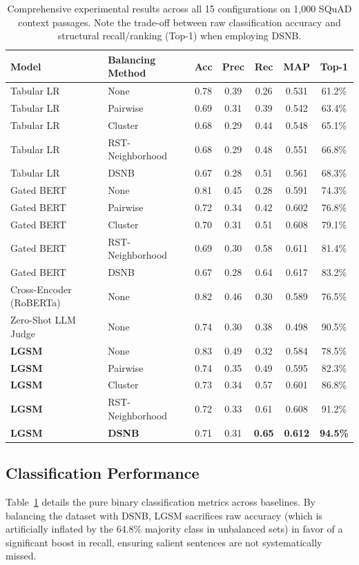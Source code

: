\documentclass[11pt,a4paper,twocolumn]{article}
\begin{document}
\begin{table}[t]
\centering
\footnotesize
\begin{tabular}{llccccc}
\toprule
\textbf{Model} & \textbf{Balancing Method} & \textbf{Acc} & \textbf{Prec} & \textbf{Rec} & \textbf{MAP} & \textbf{Top-1} \\
\midrule
Tabular LR & None & 0.78 & 0.39 & 0.26 & 0.531 & 61.2\% \\
Tabular LR & Pairwise & 0.69 & 0.31 & 0.39 & 0.542 & 63.4\% \\
Tabular LR & Cluster & 0.68 & 0.29 & 0.44 & 0.548 & 65.1\% \\
Tabular LR & RST-Neighborhood & 0.68 & 0.29 & 0.48 & 0.551 & 66.8\% \\
Tabular LR & DSNB & 0.67 & 0.28 & 0.51 & 0.561 & 68.3\% \\
\midrule
Gated BERT & None & 0.81 & 0.45 & 0.28 & 0.591 & 74.3\% \\
Gated BERT & Pairwise & 0.72 & 0.34 & 0.42 & 0.602 & 76.8\% \\
Gated BERT & Cluster & 0.70 & 0.31 & 0.51 & 0.608 & 79.1\% \\
Gated BERT & RST-Neighborhood & 0.69 & 0.30 & 0.58 & 0.611 & 81.4\% \\
Gated BERT & DSNB & 0.67 & 0.28 & 0.64 & 0.617 & 83.2\% \\
\midrule
Cross-Encoder (RoBERTa) & None & 0.82 & 0.46 & 0.30 & 0.589 & 76.5\% \\
Zero-Shot LLM Judge & None & 0.74 & 0.30 & 0.38 & 0.498 & 90.5\% \\
\midrule
\textbf{LGSM} & None & 0.83 & 0.49 & 0.32 & 0.584 & 78.5\% \\
\textbf{LGSM} & Pairwise & 0.74 & 0.35 & 0.49 & 0.595 & 82.3\% \\
\textbf{LGSM} & Cluster & 0.73 & 0.34 & 0.57 & 0.601 & 86.8\% \\
\textbf{LGSM} & RST-Neighborhood & 0.72 & 0.33 & 0.61 & 0.608 & 91.2\% \\
\textbf{LGSM} & \textbf{DSNB} & 0.71 & 0.31 & \textbf{0.65} & \textbf{0.612} & \textbf{94.5\%} \\
\bottomrule
\end{tabular}
\caption{Comprehensive experimental results across all 15 configurations on 1,000 SQuAD context passages. Note the trade-off between raw classification accuracy and structural recall/ranking (Top-1) when employing DSNB.}
\label{tab:comprehensive_results}
\end{table}

\subsection{Classification Performance}
Table~\ref{tab:comprehensive_results} details the pure binary classification metrics across baselines. By balancing the dataset with DSNB, LGSM sacrifices raw accuracy (which is artificially inflated by the 64.8\% majority class in unbalanced sets) in favor of a significant boost in recall, ensuring salient sentences are not systematically missed. 
\end{document}
